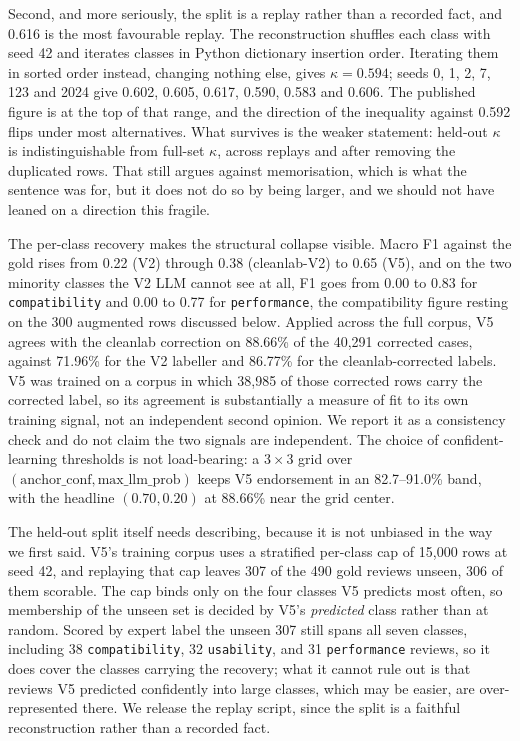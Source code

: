 \documentclass[11pt]{article}
\begin{document}
Second, and more seriously, the split is a replay rather than a recorded fact, and 0.616 is the
most favourable replay. The reconstruction shuffles each class with seed 42 and iterates classes
in Python dictionary insertion order. Iterating them in sorted order instead, changing nothing
else, gives $\kappa = 0.594$; seeds 0, 1, 2, 7, 123 and 2024 give 0.602, 0.605, 0.617, 0.590,
0.583 and 0.606. The published figure is at the top of that range, and the direction of the
inequality against 0.592 flips under most alternatives. What survives is the weaker statement:
held-out $\kappa$ is indistinguishable from full-set $\kappa$, across replays and after removing
the duplicated rows. That still argues against memorisation, which is what the sentence was for,
but it does not do so by being larger, and we should not have leaned on a direction this fragile.

The per-class recovery makes the structural collapse visible. Macro F1 against the gold rises
from 0.22 (V2) through 0.38 (cleanlab-V2) to 0.65 (V5), and on the two minority classes the V2 LLM
cannot see at all, F1 goes from 0.00 to 0.83 for \texttt{compatibility} and 0.00 to 0.77 for
\texttt{performance}, the compatibility figure resting on the 300 augmented rows discussed below. Applied across the full corpus, V5
agrees with the cleanlab correction on 88.66\% of the 40{,}291 corrected cases, against 71.96\% for the V2 labeller and 86.77\% for the cleanlab-corrected labels. V5 was trained on
a corpus in which 38{,}985 of those corrected rows carry the corrected label, so its agreement is
substantially a measure of fit to its own training signal, not an independent second opinion. We
report it as a consistency check and do not claim the two signals are independent. The choice of
confident-learning thresholds is not load-bearing: a $3\times 3$ grid over $(\text{anchor\_conf},
\text{max\_llm\_prob})$ keeps V5 endorsement in an 82.7--91.0\% band, with the headline $(0.70,
0.20)$ at 88.66\% near the grid center.

The held-out split itself needs describing, because it is not unbiased in the way we first said.
V5's training corpus uses a stratified per-class cap of 15{,}000 rows at seed 42, and replaying
that cap leaves 307 of the 490 gold reviews unseen, 306 of them scorable. The cap binds only on
the four classes V5 predicts most often, so membership of the unseen set is decided by V5's
\emph{predicted} class rather than at random. Scored by expert label the unseen 307 still spans
all seven classes, including 38 \texttt{compatibility}, 32 \texttt{usability}, and 31
\texttt{performance} reviews, so it does cover the classes carrying the recovery; what it cannot
rule out is that reviews V5 predicted confidently into large classes, which may be easier, are
over-represented there. We release the replay script, since the split is a faithful
reconstruction rather than a recorded fact.
\end{document}
